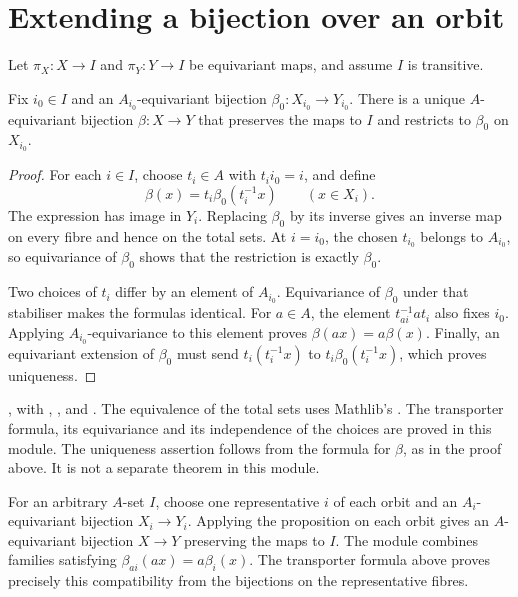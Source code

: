 \section{Extending a bijection over an orbit}

Let $\pi_X:X\to I$ and
$\pi_Y:Y\to I$ be equivariant maps, and assume $I$ is transitive.

\begin{proposition}
\label{lib:actions:fibre-transport}
Fix $i_0\in I$ and an $A_{i_0}$-equivariant bijection
$\beta_0:X_{i_0}\to Y_{i_0}$. There is a unique $A$-equivariant bijection
$\beta:X\to Y$ that preserves the maps to $I$ and restricts to $\beta_0$ on
$X_{i_0}$.
\end{proposition}
\begin{proof}
For each $i\in I$, choose $t_i\in A$ with $t_i i_0=i$, and define
\[
 \beta(x)=t_i \beta_0(t_i^{-1}x)\qquad(x\in X_i).
\]
The expression has image in $Y_i$. Replacing $\beta_0$ by its inverse gives
an inverse map on every fibre and hence on the total sets. At $i=i_0$,
the chosen $t_{i_0}$ belongs to $A_{i_0}$, so equivariance of $\beta_0$
shows that the restriction is exactly $\beta_0$.

Two choices of $t_i$ differ by an element of $A_{i_0}$. Equivariance
of $\beta_0$ under that stabiliser makes the formulas identical. For
$a\in A$, the element $t_{ai}^{-1}at_i$ also fixes $i_0$. Applying
$A_{i_0}$-equivariance to this element proves $\beta(ax)=a\beta(x)$.
Finally, an equivariant extension of $\beta_0$ must send
$t_i(t_i^{-1}x)$ to $t_i \beta_0(t_i^{-1}x)$, which proves uniqueness.
\end{proof}
\begin{implementation}
, with ,
,
 and
.
The equivalence of the total sets uses Mathlib's .
The transporter formula, its equivariance and its independence of
the choices are proved in this module.
The uniqueness assertion follows from the formula for $\beta$, as in the
proof above. It is not a separate theorem in this module.
\end{implementation}

For an arbitrary $A$-set $I$, choose one representative $i$ of each
orbit and an $A_i$-equivariant bijection $X_i\to Y_i$. Applying the
proposition on each orbit gives an $A$-equivariant bijection $X\to Y$
preserving the maps to $I$. The module
 combines families satisfying
$\beta_{ai}(ax)=a\beta_i(x)$. The transporter formula above proves precisely
this compatibility from the bijections on the representative fibres.

